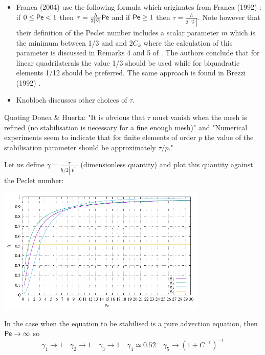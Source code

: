 \begin{itemize}
\item Franca \etal (2004) \cite{frhm04} use the following formula which originates from 
Franca \etal (1992) \cite{frfh92}: if $0\le {\mathsf{Pe}} < 1$ then
$\tau = \frac{h}{2 |\vec\upnu|} {\mathsf{Pe}}$ and if ${\mathsf{Pe}} \ge 1$ then $\tau = \frac{h}{2 |\vec\upnu|}$.
Note however that their definition of the Peclet number includes a scalar parameter $m$ which is 
the minimum between 1/3 and and 2$C_k$ where the calculation of this parameter is discussed in 
Remarks 4 and 5 of \cite{frfh92}. The authors conclude that for linear quadrilaterals the value
1/3 should be used while for biquadratic elements 1/12 should be preferred.
The same approach is found in Brezzi \etal (1992) \cite{brbf92}. 

\item Knobloch \cite{knob08} discusses other choices of $\tau$.

\end{itemize}

Quoting Donea \& Huerta: "It is obvious that $\tau$ must vanish when the mesh is refined (no stabilisation
is necessary for a fine enough mesh)" and "Numerical experiments seem to indicate that for 
finite elements of order $p$ the value of the stabilisation parameter should be approximately 
$\tau/p$."

Let us define $\gamma=\frac{\tau}{h/2|\vec\upnu|}$ (dimensionless quantity) and 
plot this quantity against the Peclet number:

\begin{center}
\includegraphics[width=10cm]{images/supg/gamma} 
\end{center}

In the case when the equation to be stabilised is a pure advection equation, 
then ${\mathsf{Pe}}\rightarrow \infty$ so 
\[
\gamma_1 \rightarrow 1  \quad
\gamma_2 \rightarrow 1 \quad
\gamma_3 \rightarrow 1 \quad
\gamma_4 \simeq 0.52 \quad
\gamma_5 \rightarrow (1+C^{-1})^{-1} 
\]


